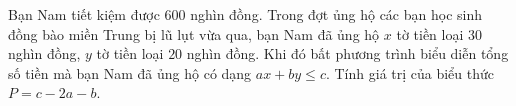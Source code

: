 \caukq
\begin{ex}%
	Bạn Nam tiết kiệm được $600$ nghìn đồng. Trong đợt ủng hộ các bạn học sinh đồng bào miền Trung bị lũ lụt vừa qua, bạn Nam đã ủng hộ $x$ tờ tiền loại $30$ nghìn đồng, $y$ tờ tiền loại $20$ nghìn đồng. Khi đó bất phương trình biểu diễn tổng số tiền mà bạn Nam đã ủng hộ có dạng $ax+by\le c$. Tính giá trị của biểu thức $P=c-2a-b$.
\end{ex}

